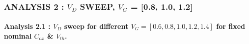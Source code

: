 \documentclass[11pt]{article}
\begin{document}
    \begin{center}
    \end{center}
    { \hspace*{\fill} \\}
    
    \hypertarget{analysis-2-v_d-sweep-v_g-0.8-1.0-1.2}{%
\subsubsection{\texorpdfstring{ANALYSIS 2 : \(V_D\) SWEEP, \(V_G\) =
{[}0.8, 1.0,
1.2{]}}{ANALYSIS 2 : V\_D SWEEP, V\_G = {[}0.8, 1.0, 1.2{]}}}\label{analysis-2-v_d-sweep-v_g-0.8-1.0-1.2}}

    \hypertarget{analysis-2.1-v_d-sweep-for-different-v_g-0.6-0.8-1.0-1.2-1.4-for-fixed-nominal-c_ox-v_th.}{%
\paragraph{\texorpdfstring{Analysis 2.1 : \(V_D\) sweep for different
\(V_G = [0.6, 0.8, 1.0, 1.2, 1.4]\) for fixed nominal \(C_{ox}\) \&
\(V_{th}\).}{Analysis 2.1 : V\_D sweep for different V\_G = {[}0.6, 0.8, 1.0, 1.2, 1.4{]} for fixed nominal C\_\{ox\} \& V\_\{th\}.}}\label{analysis-2.1-v_d-sweep-for-different-v_g-0.6-0.8-1.0-1.2-1.4-for-fixed-nominal-c_ox-v_th.}}
\end{document}
